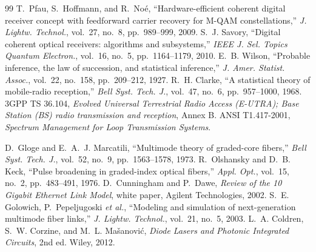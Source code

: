 \begin{thebibliography}{99}
 T.~Pfau, S.~Hoffmann, and R.~Noé, ``Hardware-efficient coherent digital receiver concept with feedforward carrier recovery for M-QAM constellations,'' \emph{J. Lightw. Technol.}, vol.~27, no.~8, pp.~989--999, 2009.
 S.~J. Savory, ``Digital coherent optical receivers: algorithms and subsystems,'' \emph{IEEE J. Sel. Topics Quantum Electron.}, vol.~16, no.~5, pp.~1164--1179, 2010.
 E.~B. Wilson, ``Probable inference, the law of succession, and statistical inference,'' \emph{J. Amer. Statist. Assoc.}, vol.~22, no.~158, pp.~209--212, 1927.
 R.~H. Clarke, ``A statistical theory of mobile-radio reception,'' \emph{Bell Syst. Tech. J.}, vol.~47, no.~6, pp.~957--1000, 1968.
 3GPP TS 36.104, \emph{Evolved Universal Terrestrial Radio Access (E-UTRA); Base Station (BS) radio transmission and reception}, Annex B.
 ANSI T1.417-2001, \emph{Spectrum Management for Loop Transmission Systems}.

 D.~Gloge and E.~A.~J. Marcatili, ``Multimode theory of graded-core fibers,'' \emph{Bell Syst. Tech. J.}, vol.~52, no.~9, pp.~1563--1578, 1973.
 R.~Olshansky and D.~B. Keck, ``Pulse broadening in graded-index optical fibers,'' \emph{Appl. Opt.}, vol.~15, no.~2, pp.~483--491, 1976.
 D.~Cunningham and P.~Dawe, \emph{Review of the 10 Gigabit Ethernet Link Model}, white paper, Agilent Technologies, 2002.
 S.~E. Golowich, P.~Pepeljugoski \emph{et al.}, ``Modeling and simulation of next-generation multimode fiber links,'' \emph{J. Lightw. Technol.}, vol.~21, no.~5, 2003.
 L.~A. Coldren, S.~W. Corzine, and M.~L. Ma\v{s}anovi\'c, \emph{Diode Lasers and Photonic Integrated Circuits}, 2nd ed. Wiley, 2012.


\end{thebibliography}
